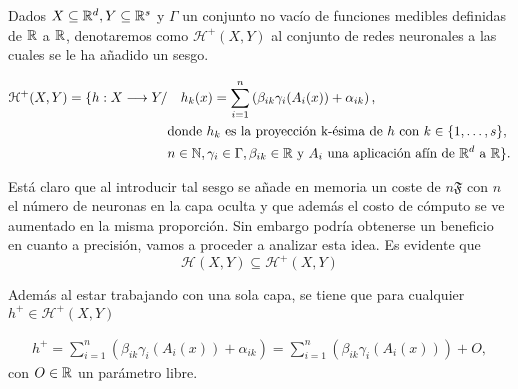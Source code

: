 \begin{aportacionOriginal}

 Dados $X \subseteq \mathbb{R}^d, Y \subseteq \mathbb{R}^s$ y  $\Gamma$ un conjunto no vacío de funciones medibles definidas de $\mathbb{R}$ a $\mathbb{R}$, denotaremos como $\mathcal{H}^+(X,Y)$ al conjunto de redes neuronales a las cuales se le ha añadido un sesgo. 

\begin{align}
    \mathcal{H}^+(X,Y) 
    =
    \{
        h : X \longrightarrow Y 
        /& \quad 
        h_k(x) = 
        \sum_{i=1}^{n} \left( \beta_{i k} \gamma_{i}( A_{i}(x)) + \alpha_{i k} \right), \\
        & \text{donde  $h_k$  es la proyección k-ésima de $h$ con 
        $k \in \{1, \ldots, s\}$}, \\
        & n \in \mathbb{N},\gamma_{i} \in \Gamma , \beta_{i k} \in \mathbb{R}
         \text{ y }A_{i} \text{ una aplicación afín de $\mathbb{R}^d$ a $\mathbb{R}$}           
    \}.
\end{align}


Está claro que al introducir tal sesgo se añade en memoria 
un coste de $n \mathfrak{F}$ con $n$ el número de neuronas en la capa oculta y que además el costo de cómputo se ve aumentado en la misma proporción. 
Sin embargo podría obtenerse un beneficio en cuanto a precisión, 
vamos a proceder  a analizar esta idea. 
Es evidente que 
\begin{equation} \label{eq:conjuntos-redes-neuronales-con-sesgo-contiene-elemental}
    \mathcal{H}(X,Y) \subseteq \mathcal{H}^+(X,Y)
\end{equation}

Además al estar trabajando con una sola capa, se tiene que para cualquier 
$h^+ \in \mathcal{H}^+(X,Y)$

\begin{align}
    h^+ = \sum_{i=1}^{n} \left(\beta_{i k} \gamma_{i}( A_{i}(x)) + \alpha_{i k} \right)
    = \sum_{i=1}^{n} \left(\beta_{i k} \gamma_{i}( A_{i}(x))\right) + O, 
\end{align}
con $O \in \mathbb{R}$ un parámetro libre.


\end{aportacionOriginal}
